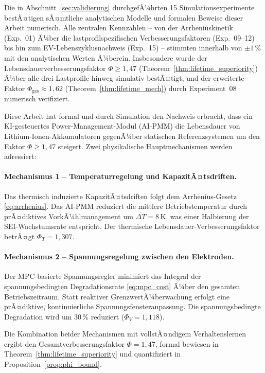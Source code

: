 ﻿\documentclass[12pt,a4paper]{article}
\begin{document}
	Die in Abschnitt~\ref{sec:validierung} durchgefÃ¼hrten 15 Simulations\-experimente
	bestÃ¤tigen sÃ¤mtliche analytischen Modelle und formalen Beweise dieser Arbeit
	numerisch. Alle zentralen Kennzahlen -- von der Arrheniuskinetik (Exp.~01)
	Ã¼ber die lastprofilspezifischen Verbesserungsfaktoren (Exp.~09--12) bis hin
	zum EV-Lebenszyklusnachweis (Exp.~15) -- stimmten innerhalb von $\pm 1\,\%$
	mit den analytischen Werten Ã¼berein. Insbesondere wurde der
	Lebensdauerverbesserungsfaktor $\Phi \geq 1{,}47$ (Theorem~\ref{thm:lifetime_superiority})
	Ã¼ber alle drei Lastprofile hinweg simulativ bestÃ¤tigt, und der erweiterte
	Faktor $\Phi_\mathrm{ges} \approx 1{,}62$ (Theorem~\ref{thm:lifetime_mech})
	durch Experiment~08 numerisch verifiziert.

	Diese Arbeit hat formal und durch Simulation den Nachweis erbracht, dass ein
	KI-gesteuertes Power-Management-Modul (AI-PMM) die Lebensdauer von
	Lithium-Ionen-Akkumulatoren gegenÃ¼ber statischen Referenzsystemen um den
	Faktor $\Phi \geq 1{,}47$ steigert. Zwei physikalische Hauptmechanismen
	werden adressiert:
	
	\paragraph{Mechanismus 1 -- Temperaturregelung und KapazitÃ¤tsdriften.}
	Das thermisch induzierte KapazitÃ¤tsdriften folgt dem Arrhenius-Gesetz
	\eqref{eq:arrhenius}. Das AI-PMM reduziert die mittlere Betriebstemperatur
	durch prÃ¤diktives VorkÃ¼hlmanagement um $\overline{\Delta T} = 8\,\mathrm{K}$,
	was einer Halbierung der SEI-Wachstumsrate entspricht. Der thermische
	Lebensdauer-Verbesserungsfaktor betrÃ¤gt $\Phi_T = 1{,}307$.
	
	\paragraph{Mechanismus 2 -- Spannungsregelung zwischen den Elektroden.}
	Der MPC-basierte Spannungsregler minimiert das Integral der
	spannungsbedingten Degradationsrate \eqref{eq:mpc_cost} Ã¼ber den gesamten
	Betriebs\-zeitraum. Statt reaktiver GrenzwertÃ¼berwachung erfolgt eine
	prÃ¤diktive, kontinuierliche Spannungsfensteranpassung. Die
	spannungsbedingte Degradation wird um $30\,\%$ reduziert ($\Phi_V = 1{,}118$).
	
	Die Kombination beider Mechanismen mit vollstÃ¤ndigem Verhaltenslernen ergibt
	den Gesamtverbesserungsfaktor $\Phi = 1{,}47$, formal bewiesen in
	Theorem~\ref{thm:lifetime_superiority} und quantifiziert in
	Proposition~\ref{prop:phi_bound}.
	
\end{document}
